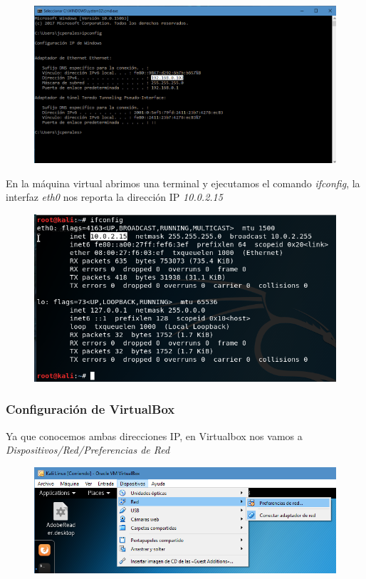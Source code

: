 \documentclass{article}
\begin{document}
\begin{figure}[H]
\centering
\includegraphics[width=1\textwidth]{01-IPCONFIG}
\end{figure}

En la m\'aquina virtual abrimos una terminal y ejecutamos el comando \emph{ifconfig}, la interfaz \emph{eth0} nos reporta la direcci\'on IP \emph{10.0.2.15}

\begin{figure}[H]
\centering
\includegraphics[width=1\textwidth]{02-IFCONFIG}
\end{figure}


\subsubsection{Configuraci\'on de VirtualBox}

Ya que conocemos ambas direcciones IP, en Virtualbox nos vamos a \emph{Dispositivos/Red/Preferencias de Red}

\begin{figure}[H]
\centering
\includegraphics[width=1\textwidth]{03-PREFERENCIADERED}
\end{figure}
\end{document}
